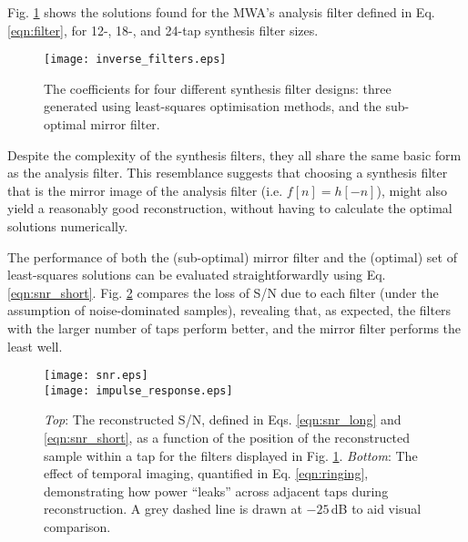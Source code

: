 \documentclass{pasa}%
\begin{document}
Fig. \ref{fig:synthfilters} shows the solutions found for the MWA's analysis filter defined in Eq. \eqref{eqn:filter}, for 12-, 18-, and 24-tap synthesis filter sizes.
\begin{figure}
    \centering
    \texttt{[image: inverse\_filters.eps]}
    \caption{The coefficients for four different synthesis filter designs: three generated using least-squares optimisation methods, and the sub-optimal mirror filter.}
    \label{fig:synthfilters}
\end{figure}
Despite the complexity of the synthesis filters, they all share the same basic form as the analysis filter.
This resemblance suggests that choosing a synthesis filter that is the mirror image of the analysis filter (i.e. $f[n] = h[-n]$), might also yield a reasonably good reconstruction, without having to calculate the optimal solutions numerically.

The performance of both the (sub-optimal) mirror filter and the (optimal) set of least-squares solutions can be evaluated straightforwardly using Eq. \eqref{eqn:snr_short}.
Fig. \ref{fig:snr} compares the loss of S/N due to each filter (under the assumption of noise-dominated samples), revealing that, as expected, the filters with the larger number of taps perform better, and the mirror filter performs the least well.
\begin{figure}
    \centering
    \texttt{[image: snr.eps]} \\[10pt]
    \texttt{[image: impulse\_response.eps]}
    \caption{\textit{Top}: The reconstructed S/N, defined in Eqs. \eqref{eqn:snr_long} and \eqref{eqn:snr_short}, as a function of the position of the reconstructed sample within a tap for the filters displayed in Fig. \ref{fig:synthfilters}. \textit{Bottom}: The effect of temporal imaging, quantified in Eq. \eqref{eqn:ringing}, demonstrating how power ``leaks'' across adjacent taps during reconstruction. A grey dashed line is drawn at $-25\,$dB to aid visual comparison.}
    \label{fig:snr}
\end{figure}
\end{document}
